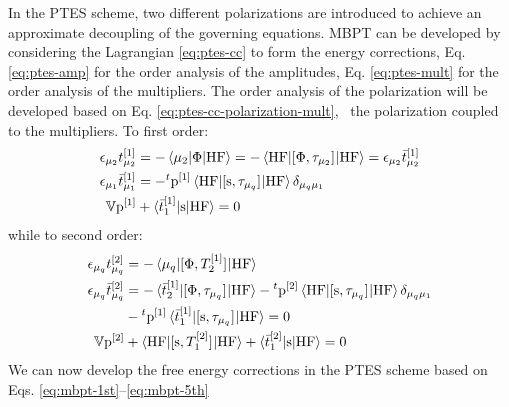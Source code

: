In the \acrshort{PTES} scheme, two different polarizations are
introduced to achieve an approximate decoupling of the governing
equations. \acrshort{MBPT} can be developed by considering the
Lagrangian \eqref{eq:ptes-cc} to form the energy corrections, Eq.
\eqref{eq:ptes-amp} for the order analysis of the amplitudes, Eq.
\eqref{eq:ptes-mult} for the order analysis of the multipliers.
The order analysis of the polarization will be developed based on
Eq. \eqref{eq:ptes-cc-polarization-mult}, \ie~the polarization coupled
to the multipliers.
To first order:
\begin{subequations}\label{eq:ptes-1st-mbpt}
  \begin{align}
  \epsilon_{\mu_2}t_{\mu_2}^{[1]} &=
  - \braket{\mu_2 | \Phi | \mathrm{HF}}
  =
  - \braket{\mathrm{HF} | [ \Phi, \tau_{\mu_2} ]^{} | \mathrm{HF}}
  =
  \epsilon_{\mu_2}\bar{t}_{\mu_2}^{[1]}
  \\
  \epsilon_{\mu_1}\bar{t}_{\mu_1}^{[1]} &=
  - {}^t\mathrm{p}^{[1]}\braket{\mathrm{HF} |
      [ \mathrm{s}, \tau_{\mu_q} ]^{} | \mathrm{HF}}\delta_{\mu_q\mu_1}
  \\
  \mathbb{V}\mathrm{p}^{[1]} &+ \braket{\bar{t}_{1}^{[1]} | \mathrm{s} | \mathrm{HF}} = 0
  \label{eq:ptes-1st-order-pol}
  \end{align}
\end{subequations}
while to second order:
\begin{subequations}\label{eq:ptes-2nd-mbpt}
  \begin{align}
    \epsilon_{\mu_q}t_{\mu_q}^{[2]}
    &= -
      \braket{\mu_q | [ \Phi, T_2^{[1]} ]^{} | \mathrm{HF}}
  \\
    \epsilon_{\mu_q}\bar{t}_{\mu_q}^{[2]}
    &=
    - \braket{\bar{t}_{2}^{[1]} | [ \Phi, \tau_{\mu_q} ]^{} | \mathrm{HF}}
    - {}^t\mathrm{p}^{[2]}\braket{\mathrm{HF} |
      [ \mathrm{s}, \tau_{\mu_q} ]^{} | \mathrm{HF}}\delta_{\mu_q\mu_1}
      \nonumber \\
    &- {}^t\mathrm{p}^{[1]}\braket{\bar{t}_{1}^{[1]} | [ \mathrm{s}, \tau_{\mu_q} ]^{} | \mathrm{HF}}
    = 0
    \label{eq:ptes-2nd-order-mult}
  \\
  \mathbb{V}\mathrm{p}^{[2]} &+ \braket{\mathrm{HF} | [ \mathrm{s}, T_1^{[2]} ]^{}| \mathrm{HF}}
  + \braket{\bar{t}_{1}^{[2]} | \mathrm{s} | \mathrm{HF}} = 0
  \label{eq:ptes-2nd-order-pol}
  \end{align}
\end{subequations}
We can now develop the free energy corrections in the \acrshort{PTES}
scheme based on Eqs. \eqref{eq:mbpt-1st}--\eqref{eq:mbpt-5th}
